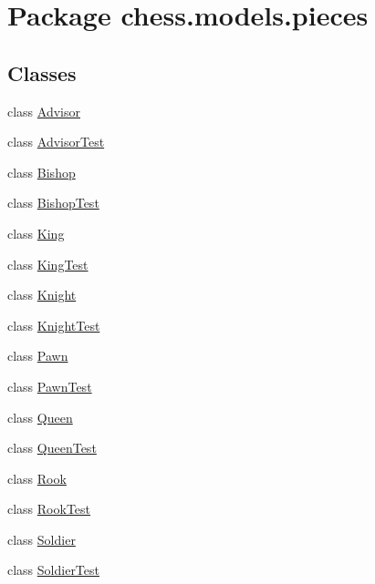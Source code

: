 \hypertarget{namespacechess_1_1models_1_1pieces}{}\section{Package chess.\+models.\+pieces}
\label{namespacechess_1_1models_1_1pieces}
\subsection*{Classes}
\begin{DoxyCompactItemize}
\item 
class \mbox{\hyperlink{classchess_1_1models_1_1pieces_1_1_advisor}{Advisor}}
\item 
class \mbox{\hyperlink{classchess_1_1models_1_1pieces_1_1_advisor_test}{Advisor\+Test}}
\item 
class \mbox{\hyperlink{classchess_1_1models_1_1pieces_1_1_bishop}{Bishop}}
\item 
class \mbox{\hyperlink{classchess_1_1models_1_1pieces_1_1_bishop_test}{Bishop\+Test}}
\item 
class \mbox{\hyperlink{classchess_1_1models_1_1pieces_1_1_king}{King}}
\item 
class \mbox{\hyperlink{classchess_1_1models_1_1pieces_1_1_king_test}{King\+Test}}
\item 
class \mbox{\hyperlink{classchess_1_1models_1_1pieces_1_1_knight}{Knight}}
\item 
class \mbox{\hyperlink{classchess_1_1models_1_1pieces_1_1_knight_test}{Knight\+Test}}
\item 
class \mbox{\hyperlink{classchess_1_1models_1_1pieces_1_1_pawn}{Pawn}}
\item 
class \mbox{\hyperlink{classchess_1_1models_1_1pieces_1_1_pawn_test}{Pawn\+Test}}
\item 
class \mbox{\hyperlink{classchess_1_1models_1_1pieces_1_1_queen}{Queen}}
\item 
class \mbox{\hyperlink{classchess_1_1models_1_1pieces_1_1_queen_test}{Queen\+Test}}
\item 
class \mbox{\hyperlink{classchess_1_1models_1_1pieces_1_1_rook}{Rook}}
\item 
class \mbox{\hyperlink{classchess_1_1models_1_1pieces_1_1_rook_test}{Rook\+Test}}
\item 
class \mbox{\hyperlink{classchess_1_1models_1_1pieces_1_1_soldier}{Soldier}}
\item 
class \mbox{\hyperlink{classchess_1_1models_1_1pieces_1_1_soldier_test}{Soldier\+Test}}
\end{DoxyCompactItemize}
